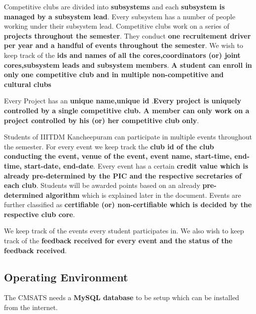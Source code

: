 \noindent Competitive clubs are divided into \textbf{subsystems} and each 
\textbf{subsystem is managed by a subsystem lead}. Every subsystem has a number of people working under their subsystem lead. Competitive clubs work on a series of \textbf{projects throughout the semester}. They conduct \textbf{one recruitement driver per year and a handful of events throughout the semester}. We wish to keep track of the \textbf{ids and names of all the cores,coordinators (or) joint cores,subsystem leads and subsystem members}.
\textbf{A student can enroll in only one competitive club and in multiple non-competitive and cultural clubs}
\vspace{1em}

\noindent Every Project has an \textbf{unique name,unique id }.\textbf{Every project is uniquely controlled by a single competitive club. A member can only work on a project controlled by his (or) her competitive club only}.
\vspace{1em}

\noindent Students of IIITDM Kancheepuram can participate in multiple events throughout the semester. For every event we keep track the \textbf{club id of the club conducting the event, venue of the event, event name, start-time, end-time, start-date, end-date}. Every event has a certain \textbf{credit value which is already pre-determined by the PIC and the respective secretaries of each club}. Students will be awarded points based on an already \textbf{pre-determined algorithm} which is explained later in the document. Events are further classified as \textbf{certifiable (or) non-certifiable which is decided by the respective club core}.
\vspace{1em}

\noindent We keep track of the events every student participates in. We also wish to keep track of the \textbf{feedback received for every event and the status of the feedback received}. 

\subsection{Operating Environment}
The CMSATS needs a \textbf{MySQL database} to  be setup which can be installed from the internet.
\newpage
